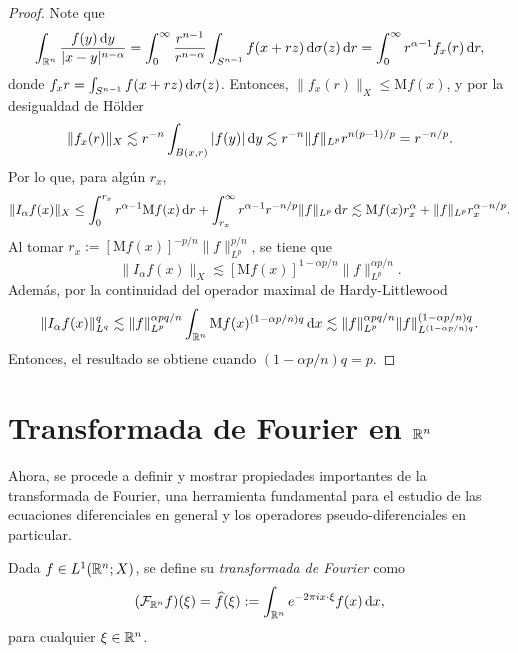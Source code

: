 \begin{proof}
	Note que 
	\begin{equation*}
		\int_{\mathbb{R}^n} \frac{f(y)\mathop{}\!\mathrm{d} y}{|x-y|^{n-\alpha}} = \int_0^\infty \frac{r^{n-1}}{r^{n-\alpha}}  \int_{S^{n-1}} f(x+rz) \mathop{}\!\mathrm{d} \sigma(z) \mathop{}\!\mathrm{d} r = \int_0^\infty r^{\alpha-1} f_x(r)\mathop{}\!\mathrm{d} r,
	\end{equation*}
	donde $f_xr = \int_{S^{n-1}} f(x+rz) \mathop{}\!\mathrm{d} \sigma(z) $. Entonces, $\|f_x(r)\|_X \leq \mathrm{M}f(x)$, y por la desigualdad de Hölder
	\begin{equation*}
		\|f_x(r)\|_X \lesssim r^{-n}\int_{B(x, r)}| f(y)|\mathop{}\!\mathrm{d} y \lesssim r^{-n}\|f\|_{L^p} r^{n(p-1)/p}  = r^{-n/p}.
	\end{equation*}
	Por lo que, para algún $r_x$,
	\begin{equation*}
		\|I_\alpha f(x) \|_X\leq \int_0^{r_x} r^{\alpha-1} \mathrm{M}f(x)\mathop{}\!\mathrm{d} r + \int_{r_x}^\infty r^{\alpha-1}r^{-n/p} \|f\|_{L^p}\mathop{}\!\mathrm{d} r \lesssim \mathrm{M}f(x)r_x^{\alpha} + \|f\|_{L^p}r_x^{\alpha-n/p}.
	\end{equation*}
	Al tomar $r_x := [\mathrm{M}f(x)]^{-p/n}\|f\|_{L^p}^{p/n}$, se tiene que 
	\begin{equation*}
		\|I_\alpha f(x) \|_X\lesssim [\mathrm{M}f(x)]^{1 -\alpha p/n} \|f\|_{L^p}^{\alpha p/n}.
	\end{equation*}
	Además, por la continuidad del operador maximal de Hardy-Littlewood
	\begin{equation*}
		\|I_\alpha f(x) \|_{L^q}^q \lesssim \|f\|_{L^p}^{\alpha pq/n} \int_{\mathbb{R}^n}\mathrm{M}f(x)^{(1 -\alpha p/n)q}\mathop{}\!\mathrm{d} x \lesssim  \|f\|_{L^p}^{\alpha pq/n} \|f\|_{L^{(1 -\alpha p/n)q}}^{(1 -\alpha p/n)q}.
	\end{equation*}
	Entonces, el resultado se obtiene cuando $(1 -\alpha p/n)q = p$.
\end{proof}
\section{Transformada de Fourier en $\mathbb{R}^n$}
Ahora, se procede a definir y mostrar propiedades importantes de la
transformada de Fourier, una herramienta fundamental para el estudio
de las ecuaciones diferenciales en general y los operadores
pseudo-diferenciales en particular. 

\begin{definition}
    Dada $f\in L^1(\mathbb{R}^n;X)$, se define su \textit{transformada de Fourier }como 
    \begin{equation*}
        (\mathcal{F}_{\mathbb{R}^n}f)(\xi) = \widehat{f}(\xi) := \int_{\mathbb{R}^n}
        e^{-2\pi i x \cdot \xi} f(x) \mathop{}\!\mathrm{d} x,
    \end{equation*}
    para cualquier $\xi \in \mathbb{R}^n$.
\end{definition}

